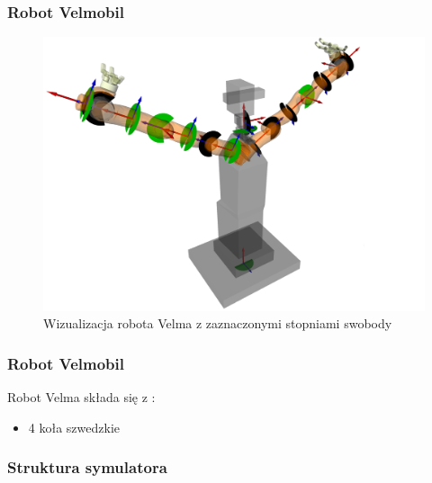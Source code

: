 
\begin{frame}
\frametitle{Robot Velmobil}
\begin{figure}
\includegraphics[scale=0.22]{./images/velma_joints.png}
\caption{Wizualizacja robota Velma z zaznaczonymi stopniami swobody \cite{docsVelma}}
\end{figure}
\end{frame}


\begin{frame}
\frametitle{Robot Velmobil}
Robot Velma składa się z \cite{docsVelma}:  
\begin{itemize}
	\item 4 koła szwedzkie
\end{itemize}
\end{frame}


\begin{frame}
\frametitle{Struktura symulatora}

\end{frame}